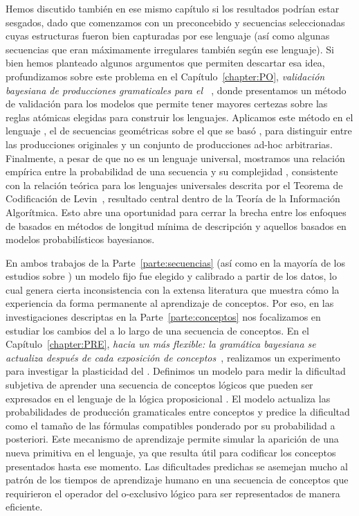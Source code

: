 Hemos discutido también en ese mismo capítulo si los resultados podrían estar sesgados, dado que comenzamos con un \lot preconcebido y secuencias seleccionadas cuyas estructuras fueron bien capturadas por ese lenguaje (así como algunas secuencias que eran máximamente irregulares también según ese lenguaje). Si bien hemos planteado algunos argumentos que permiten descartar esa idea, profundizamos sobre este problema en el Capítulo~\ref{chapter:PO}, \textit{validación bayesiana de producciones gramaticales para el \lot~\cite{romano2018bayesian}}, donde presentamos un método de validación para los modelos \lot que permite tener mayores certezas sobre las reglas atómicas elegidas para construir los lenguajes. Aplicamos este método en el lenguaje \gramgeo, el \lot de secuencias geométricas sobre el que se basó \grambin, para distinguir entre las producciones originales y un conjunto de producciones ad-hoc arbitrarias. Finalmente, a pesar de que \gramgeo no es un lenguaje universal, mostramos una relación empírica entre la probabilidad de una secuencia y su complejidad \mdlgeo, consistente con la relación teórica para los lenguajes universales descrita por el Teorema de Codificación de Levin~\cite{levin1974laws}, resultado central dentro de la Teoría de la Información Algorítmica. Esto abre una oportunidad para cerrar la brecha entre los enfoques de \lot basados en métodos de longitud mínima de descripción y aquellos basados en modelos probabilísticos bayesianos.

En ambos trabajos de la Parte~\ref{parte:secuencias} (así como en la mayoría de los estudios sobre \lot) un modelo fijo fue elegido y calibrado a partir de los datos, lo cual genera cierta inconsistencia con la extensa literatura que muestra cómo la experiencia da forma permanente al aprendizaje de conceptos. Por eso, en las investigaciones descriptas en la Parte~\ref{parte:conceptos} nos focalizamos en estudiar los cambios del \lot a lo largo de una secuencia de conceptos. En el Capítulo~\ref{chapter:PRE}, \textit{hacia un \lot más flexible: la gramática bayesiana se actualiza después de cada exposición de conceptos~\cite{tano2020towards}}, realizamos un experimento para investigar la plasticidad del \lot. Definimos un modelo para medir la dificultad subjetiva de aprender una secuencia de conceptos lógicos que pueden ser expresados en el lenguaje de la lógica proposicional \grambool. El modelo actualiza las probabilidades de producción gramaticales entre conceptos y predice la dificultad como el tamaño de las fórmulas compatibles ponderado por su probabilidad a posteriori. Este mecanismo de aprendizaje permite simular la aparición de una nueva primitiva en el lenguaje, ya que resulta útil para codificar los conceptos presentados hasta ese momento. Las dificultades predichas se asemejan mucho al patrón de los tiempos de aprendizaje humano en una secuencia de conceptos que requirieron el operador del o-exclusivo lógico para ser representados de manera eficiente.

